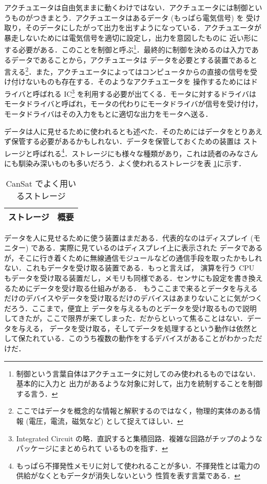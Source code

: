 \documentclass[dvipdfmx]{jsarticle}
\begin{document}
アクチュエータは自由気ままに動くわけではない．アクチュエータには制御というものがつきまとう．アクチュエータはあるデータ (もっぱら電気信号) を
受け取り，そのデータにしたがって出力を出すようになっている．アクチュエータが暴走しないためには電気信号を適切に設定し，出力を意図したものに
近い形にする必要がある．このことを制御と呼ぶ\footnote{制御という言葉自体はアクチュエータに対してのみ使われるものではない．基本的に入力と
出力があるような対象に対して，出力を統制することを制御する言う．}．最終的に制御を決めるのは入力であるデータであることから，アクチュエータは
データを必要とする装置であると言える\footnote{ここではデータを概念的な情報と解釈するのではなく，物理的実体のある情報 (電圧，電流，磁気など) 
として捉えてほしい．}．また，アクチュエータによってはコンピュータからの直接の信号を受け付けないものも存在する．そのようなアクチュエータを
操作するためにはドライバと呼ばれる IC\footnote{Integrated Circuit の略．直訳すると集積回路．複雑な回路がチップのようなパッケージにまとめられて
いるものを指す．} を利用する必要が出てくる．モータに対するドライバはモータドライバと呼ばれ，モータの代わりにモータドライバが信号を受け付け，
モータドライバはその入力をもとに適切な出力をモータへ送る．

データは人に見せるために使われるとも述べた．そのためにはデータをとりあえず保管する必要があるかもしれない．データを保管しておくための装置は
ストレージと呼ばれる\footnote{もっぱら不揮発性メモリに対して使われることが多い．不揮発性とは電力の供給がなくともデータが消失しないという
性質を表す言葉である．}．ストレージにも様々な種類があり，これは読者のみなさんにも馴染み深いものも多いだろう．よく使われるストレージを表
\ref{tab:2.2.3-storage}に示す．

\begin{table}[htbp]
  \centering
  \caption{CanSat でよく用いるストレージ}
  \begin{tabular}{c|r} \hline
    ストレージ & 概要 \\ \hline
  \end{tabular}
  \label{tab:2.2.3-storage}
\end{table}

データを人に見せるために使う装置はまだある．代表的なのはディスプレイ (モニター) である．実際に見ているのはディスプレイ上に表示された
データであるが，そこに行き着くために無線通信モジュールなどの通信手段を取ったかもしれない．これもデータを受け取る装置である．もっと言えば，
演算を行う CPU もデータを受け取る装置だし，メモリも同様である．センサにも設定を書き換えるためにデータを受け取る仕組みがある．
もうここまで来るとデータを与えるだけのデバイスやデータを受け取るだけのデバイスはあまりないことに気がつくだろう．ここまで，便宜上
データを与えるものとデータを受け取るもので説明してきたが，ここで限界が来てしまった．だからといって焦ることはない．データを与える，
データを受け取る，そしてデータを処理するという動作は依然として保たれている．このうち複数の動作をするデバイスがあることがわかっただけだ．
\end{document}
